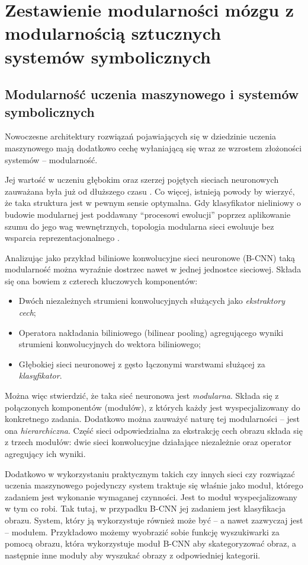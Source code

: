 \section{Zestawienie modularności mózgu z modularnością sztucznych systemów symbolicznych}

\subsection{Modularność uczenia maszynowego i systemów symbolicznych}

Nowoczesne architektury rozwiązań pojawiających się w dziedzinie uczenia maszynowego mają dodatkowo cechę wyłaniającą się wraz ze wzrostem złożoności systemów -- modularność.

Jej wartość w uczeniu głębokim oraz szerzej pojętych sieciach neuronowych zauważana była już od dłuższego czasu \cite{schmidt1998modularity}.
Co więcej, istnieją powody by wierzyć, że taka struktura jest w pewnym sensie optymalna.
Gdy klasyfikator nieliniowy o budowie modularnej jest poddawany ``procesowi ewolucji'' poprzez aplikowanie szumu do jego wag wewnętrznych, topologia modularna sieci ewoluuje bez wsparcia reprezentacjonalnego \cite{hoverstad2011noise}.

Analizując jako przykład biliniowe konwolucyjne sieci neuronowe (B-CNN) \cite{lin2015bilinear} taką modularność można wyraźnie dostrzec nawet w jednej jednostce sieciowej.
Składa się ona bowiem z czterech kluczowych komponentów:
\begin{itemize}
	\item Dwóch niezależnych strumieni konwolucyjnych służących jako \emph{ekstraktory cech};
	\item Operatora nakładania biliniowego (bilinear pooling) agregującego wyniki strumieni konwolucyjnych do wektora biliniowego;
	\item Głębokiej sieci neuronowej z gęsto łączonymi warstwami służącej za \emph{klasyfikator}.
\end{itemize}
Można więc stwierdzić, że taka sieć neuronowa jest \emph{modularna}. Składa się z połączonych komponentów (modułów), z których każdy jest wyspecjalizowany do konkretnego zadania.
Dodatkowo można zauważyć naturę tej modularności -- jest ona \emph{hierarchiczna}.
Część sieci odpowiedzialna za ekstrakcję cech obrazu składa się z trzech modułów: dwie sieci konwolucyjne działające niezależnie oraz operator agregujący ich wyniki.

Dodatkowo w wykorzystaniu praktycznym takich czy innych sieci czy rozwiązać uczenia maszynowego pojedynczy system traktuje się właśnie jako moduł, którego zadaniem jest wykonanie wymaganej czynności.
Jest to moduł wyspecjalizowany w tym co robi.
Tak tutaj, w przypadku B-CNN jej zadaniem jest klasyfikacja obrazu.
System, który ją wykorzystuje również może być -- a nawet zazwyczaj jest -- modułem.
Przykładowo możemy wyobrazić sobie funkcję wyszukiwarki za pomocą obrazu, która wykorzystuje moduł B-CNN aby skategoryzować obraz, a następnie inne moduły aby wyszukać obrazy z odpowiedniej kategorii.


